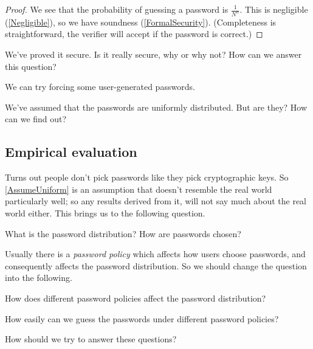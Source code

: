 \begin{frame}
  \begin{proof}
    We see that the probability of guessing a password is \(\frac{1}{N^n}\).
    This is negligible (\cref{Negligible}), so we have soundness 
    (\cref{FormalSecurity}).
    (Completeness is straightforward, the verifier will accept if the password 
    is correct.)
  \end{proof}
\end{frame}

\begin{frame}
  \begin{exercise}
    We've proved it secure.
    Is it really secure, why or why not?
    How can we answer this question?
  \end{exercise}

  \begin{solution}
    We can try forcing some user-generated passwords.

    We've assumed that the passwords are uniformly distributed.
    But are they?
    How can we find out?
  \end{solution}
\end{frame}

\subsection{Empirical evaluation}

Turns out people don't pick passwords like they pick cryptographic keys.
So \cref{AssumeUniform} is an assumption that doesn't resemble the real world 
particularly well; so any results derived from it, will not say much about the 
real world either.
This brings us to the following question.

\begin{frame}
\begin{question}\label{PasswordDistribution}
  What is the password distribution?
  How are passwords chosen?
\end{question}
\end{frame}

Usually there is a \emph{password policy} which affects how users choose 
passwords, and consequently affects the password distribution.
So we should change the question into the following.

\begin{frame}
\begin{question}
  How does different password policies affect the password distribution?
\end{question}
\begin{question}\label{Guessability}
  How easily can we guess the passwords under different password policies?
\end{question}
\begin{exercise}
  How should we try to answer these questions?
\end{exercise}
\end{frame}

